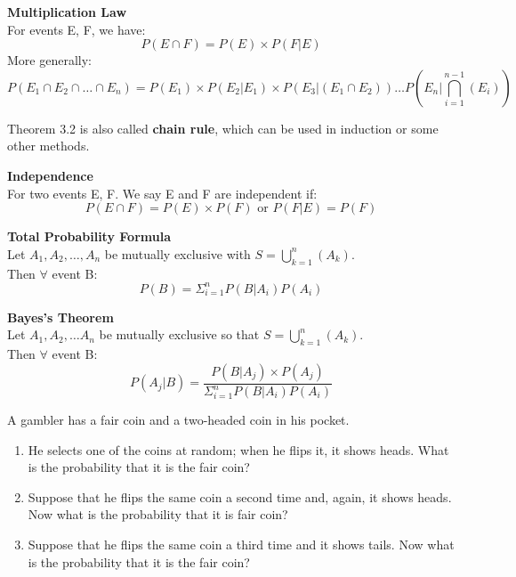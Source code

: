 \documentclass{article}
\begin{document}
\begin{theorem}
    \textbf{Multiplication Law}\\
    For events E, F, we have:
    $$ P(E \cap F) = P(E)\times P(F|E)$$
    More generally:
    $$ P(E_1 \cap E_2 \cap \dots \cap E_n) = P(E_1)\times P(E_2|E_1)\times P(E_3|(E_1 \cap E_2))\dots P(E_n|\bigcap^{n-1}_{i=1}(E_i))$$
\end{theorem}
Theorem 3.2 is also called \textbf{chain rule}, which can be used in induction or some other methods.
\begin{definition}
    \textbf{Independence}\\
    For two events E, F. We say E and F are independent if:
    $$ P(E \cap F) = P(E)\times P(F) \text{ or } P(F|E) = P(F)$$
\end{definition}

\begin{theorem}
    \textbf{Total Probability Formula}\\
    Let $A_1,A_2,\dots,A_n$ be mutually exclusive with $S = \bigcup^n_{k=1}(A_k)$.\\
    Then $\forall$ event B:
    $$ P(B) = \Sigma^n_{i=1}P(B|A_i)P(A_i)$$
\end{theorem}

\begin{theorem}
    \textbf{Bayes's Theorem}\\
    Let $A_1,A_2,\dots A_n$ be mutually exclusive so that $S = \bigcup^n_{k=1}(A_k)$.\\
    Then $\forall$ event B:
    $$ P(A_j|B) = \frac{P(B|A_j)\times P(A_j)}{\Sigma^n_{i=1}P(B|A_i)P(A_i)}$$
\end{theorem}

\begin{quiz}
    A gambler has a fair coin and a two-headed coin in his pocket.
    \begin{enumerate}
        \item He selects one of the coins at random; when he flips it, it shows heads. What is the probability that it is the fair coin?
        \item Suppose that he flips the same coin a second time and, again, it shows heads. Now what is the probability that it is fair coin?
        \item Suppose that he flips the same coin a third time and it shows tails. Now what is the probability that it is the fair coin?
    \end{enumerate}
\end{quiz}
\end{document}
